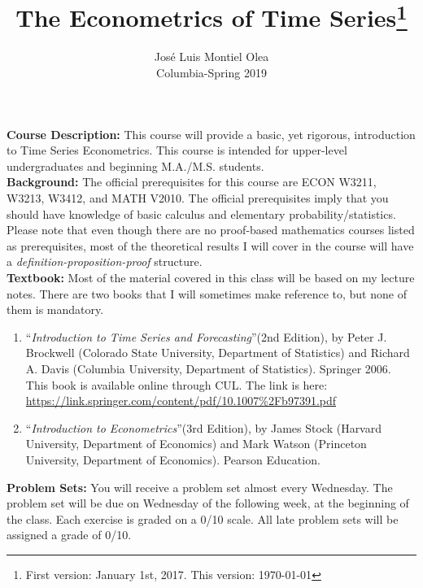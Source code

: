 \documentclass[12pt]{article} %
\title {The Econometrics of Time Series\thanks{First version: January 1st, 2017. This version: \today}}
\author {Jos\'e Luis Montiel Olea \protect\\
Columbia-Spring 2019 \protect \\
}
\date{}
\numberwithin{equation}{section}
\theoremstyle{definition}
\newcommand{\0}{\textbf{0}}                          %
\begin{document}
\onehalfspace
\maketitle


\noindent \textbf{Course Description:} This course will provide a basic, yet rigorous, introduction to Time Series Econometrics. This course is intended for upper-level undergraduates and beginning M.A./M.S. students.  \\


\noindent \textbf{Background:} The official prerequisites for this course are ECON W3211, W3213, W3412, and MATH V2010. The official prerequisites imply that you should have knowledge of basic calculus and elementary probability/statistics. Please note that even though there are no proof-based mathematics courses listed as prerequisites, most of the theoretical results I will cover in the course will have a \emph{definition-proposition-proof} structure.  \\ 

\noindent \textbf{Textbook:} Most of the material covered in this class will be based on my lecture notes. There are two books that I will sometimes make reference to, but none of them is mandatory. 

\begin{enumerate}

\item ``\emph{Introduction to Time Series and Forecasting}\textquotedblright \: [ITSF] (2nd Edition), by Peter J. Brockwell (Colorado State University, Department of Statistics) and Richard A. Davis (Columbia University, Department of Statistics). Springer 2006. \\

This book is available online through CUL. The link is here: \\

\url{https://link.springer.com/content/pdf/10.1007\%2Fb97391.pdf}

\item ``\emph{Introduction to Econometrics}\textquotedblright \: [IE] (3rd Edition), by James Stock (Harvard University, Department of Economics) and Mark Watson (Princeton University, Department of Economics). Pearson Education.\\ 

\end{enumerate}

\noindent \textbf{Problem Sets:} You will receive a problem set almost every Wednesday. The problem set will be due on Wednesday of the following week, at the beginning of the class. Each exercise is graded on a 0/10 scale. All late problem sets will be assigned a grade of 0/10. \\
 
\end{document}
